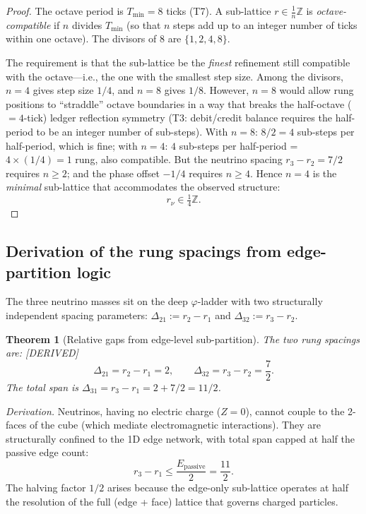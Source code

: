 \documentclass[11pt,a4paper]{article}
\newtheorem{theorem}{Theorem}[section]
\theoremstyle{definition}
\theoremstyle{remark}
\newcommand{\phig}{\varphi}
\newcommand{\Epass}{E_{\mathrm{passive}}}
\newcommand{\Zidx}{Z}
\newcommand{\DERIVED}{\textcolor{blue!70!black}{\footnotesize\textsf{[DERIVED]}}}
\begin{document}
\begin{proof}
The octave period is $T_{\min} = 8$ ticks (T7).  A sub-lattice
$r \in \frac{1}{n}\mathbb{Z}$ is \emph{octave-compatible} if $n$ divides
$T_{\min}$ (so that $n$ steps add up to an integer number of ticks within one
octave).  The divisors of $8$ are $\{1, 2, 4, 8\}$.

The requirement is that the sub-lattice be the \emph{finest} refinement still
compatible with the octave---i.e., the one with the smallest step size.
Among the divisors, $n = 4$ gives step size $1/4$, and $n = 8$ gives
$1/8$.  However, $n = 8$ would allow rung positions to ``straddle'' octave
boundaries in a way that breaks the half-octave ($= 4$-tick) ledger reflection
symmetry (T3: debit/credit balance requires the half-period to be an integer
number of sub-steps).  With $n = 8$: $8/2 = 4$ sub-steps per half-period, which
is fine; with $n = 4$: $4$ sub-steps per half-period = $4 \times (1/4) = 1$ rung,
also compatible.  But the neutrino spacing $r_3 - r_2 = 7/2$ requires
$n \geq 2$; and the phase offset $-1/4$ requires $n \geq 4$.  Hence $n = 4$
is the \emph{minimal} sub-lattice that accommodates the observed structure:
\begin{equation}
  r_\nu \in \tfrac{1}{4}\mathbb{Z}.
  \label{eq:quarter_lattice}
\end{equation}
\end{proof}

\subsection{Derivation of the rung spacings from edge-partition logic}

The three neutrino masses sit on the deep $\phig$-ladder with two structurally
independent spacing parameters: $\Delta_{21} := r_2 - r_1$ and
$\Delta_{32} := r_3 - r_2$.

\begin{theorem}[Relative gaps from edge-level sub-partition]
\label{thm:nu_gaps}
The two rung spacings are: \DERIVED{}
\begin{equation}
  \boxed{\Delta_{21} = r_2 - r_1 = 2, \qquad
         \Delta_{32} = r_3 - r_2 = \frac{7}{2}.}
  \label{eq:nu_gaps}
\end{equation}
The total span is $\Delta_{31} = r_3 - r_1 = 2 + 7/2 = 11/2$.
\end{theorem}

\noindent\textit{Derivation.}\quad
Neutrinos, having no electric charge ($\Zidx = 0$), cannot couple to the
2-faces of the cube (which mediate electromagnetic interactions).  They are
structurally confined to the 1D edge network, with total span capped at half
the passive edge count:
\begin{equation}
  r_3 - r_1 \leq \frac{\Epass}{2} = \frac{11}{2}.
  \label{eq:nu_span}
\end{equation}
The halving factor $1/2$ arises because the edge-only sub-lattice operates
at half the resolution of the full (edge + face) lattice that governs charged
particles.
\end{document}
